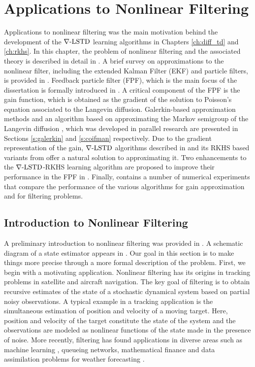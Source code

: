 \chapter{Applications to Nonlinear Filtering} 
\label{ch:filtering}
Applications to nonlinear filtering was the main motivation behind the development of the $\nabla\text{-LSTD}$ learning algorithms in Chapters \ref{ch:diff_td} and \ref{ch:rkhs}. In this chapter, the problem of nonlinear filtering and the associated theory is described in detail in . A brief survey on approximations to the nonlinear filter, including the extended Kalman Filter (EKF) and particle filters, is provided in . Feedback particle filter (FPF), which is the main focus of the dissertation is formally introduced in . A critical component of the FPF is the gain function, which is obtained as the gradient of the solution to Poisson's equation associated to the Langevin diffusion. Galerkin-based approximation methods and an algorithm based on approximating the Markov semigroup of the Langevin diffusion \cite{tagmeh16a}, which was developed in parallel research are presented in Sections \ref{s:galerkin} and \ref{s:coifman} respectively. Due to the gradient representation of the gain, $\nabla\text{-LSTD}$ algorithms described in  and its RKHS based variants from  offer a natural solution to approximating it. Two enhancements to the $\nabla\text{-LSTD}$-RKHS learning algorithm are proposed to improve their performance in the FPF in . Finally,  contains a number of numerical experiments that compare the performance of the various algorithms for gain approximation and for filtering problems.  
\section{Introduction to Nonlinear Filtering} 
\label{s:nl_filtering_intro}
A preliminary introduction to nonlinear filtering was provided in . A schematic diagram of a state estimator appears in . Our goal in this section is to make things more precise through a more formal description of the problem. First, we begin with a motivating application. Nonlinear filtering has its origins in tracking problems in satellite and aircraft navigation. The key goal of filtering is to obtain recursive estimates of the state of a stochastic dynamical system based on partial noisy observations. A typical example in a tracking application is the simultaneous estimation of position and velocity of a moving target. Here, position and velocity of the target constitute the state of the system and the observations are modeled as nonlinear functions of the state made in the presence of noise. More recently, filtering has found applications in diverse areas such as machine learning \cite{bishop06}, queueing networks, mathematical finance \cite{brihan08} and data assimilation problems for weather forecasting \cite{eve94}. 

